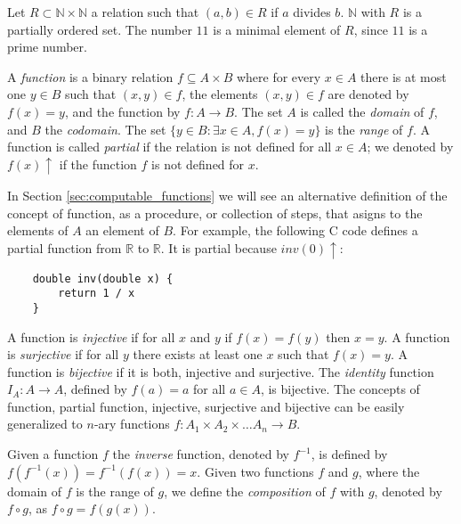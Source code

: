 \begin{example}
Let $R \subset \mathbb{N} \times \mathbb{N}$ a relation such that $(a, b) \in R$ if $a$ divides $b$. $\mathbb{N}$ with $R$ is a partially ordered set. The number $11$ is a minimal element of $R$, since $11$ is a prime number.
\end{example}


A \emph{function} is a binary relation $f \subseteq A \times B$ where for every $x \in A$ there is at most one $y \in B$ such that $\left(x, y\right) \in f$, the elements $\left(x, y\right) \in f$ are denoted by $f(x)=y$, and the function by $f : A \rightarrow B$. The set $A$ is called the \emph{domain} of $f$, and $B$ the \emph{codomain}. The set $\{ y \in B : \exists x \in A , f(x) = y\}$ is the \emph{range} of $f$. A function is called \emph{partial} if the relation is not defined for all $x \in A$; we denoted by $f(x) \uparrow$ if the function $f$ is not defined for $x$. 

\begin{example}
In Section \ref{sec:computable_functions} we will see an alternative definition of the concept of function, as a procedure, or collection of steps, that asigns to the elements of $A$ an element of $B$. For example, the following C code defines a partial function from $\mathbb{R}$ to $\mathbb{R}$. It is partial because $inv(0)\uparrow$:
\begin{verbatim}
    double inv(double x) {
        return 1 / x
    }
\end{verbatim}
\end{example}

A function is \emph{injective} if for all $x$ and $y$ if $f(x) = f(y)$ then $x=y$. A function is \emph{surjective} if for all $y$ there exists at least one $x$ such that $f(x) = y$. A function is \emph{bijective} if it is both, injective and surjective. The \emph{identity} function $I_A : A \rightarrow A$, defined by $f(a) = a$ for all $a \in A$, is bijective. The concepts of function, partial function, injective, surjective and bijective can be easily generalized to $n$-ary functions $f: A_1 \times A_2 \times \dots A_n \rightarrow B$.

Given a function $f$ the \emph{inverse} function, denoted by $f^{-1}$, is defined by $f(f^{-1}(x)) = f^{-1}(f(x)) = x$. Given two functions $f$ and $g$, where the domain of $f$ is the range of $g$, we define the \emph{composition} of $f$ with $g$, denoted by $f \circ g$, as $f \circ g = f(g(x))$.

